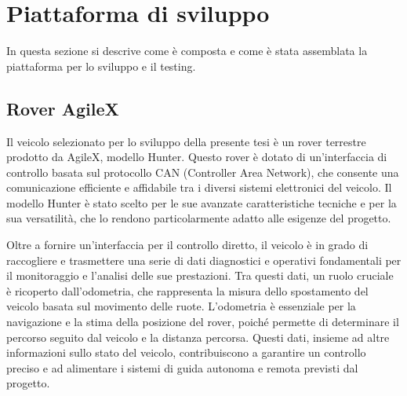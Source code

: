 \section{Piattaforma di sviluppo}
In questa sezione si descrive come è composta e come è stata assemblata la piattaforma per lo sviluppo e il testing.
\subsection{Rover AgileX}
Il veicolo selezionato per lo sviluppo della presente tesi è un rover terrestre prodotto da AgileX, modello Hunter. Questo rover è dotato di un'interfaccia di controllo basata sul protocollo CAN (Controller Area Network), che consente una comunicazione efficiente e affidabile tra i diversi sistemi elettronici del veicolo. Il modello Hunter è stato scelto per le sue avanzate caratteristiche tecniche e per la sua versatilità, che lo rendono particolarmente adatto alle esigenze del progetto.

\noindent Oltre a fornire un'interfaccia per il controllo diretto, il veicolo è in grado di raccogliere e trasmettere una serie di dati diagnostici e operativi fondamentali per il monitoraggio e l'analisi delle sue prestazioni. Tra questi dati, un ruolo cruciale è ricoperto dall'odometria, che rappresenta la misura dello spostamento del veicolo basata sul movimento delle ruote. L'odometria è essenziale per la navigazione e la stima della posizione del rover, poiché permette di determinare il percorso seguito dal veicolo e la distanza percorsa. Questi dati, insieme ad altre informazioni sullo stato del veicolo, contribuiscono a garantire un controllo preciso e ad alimentare i sistemi di guida autonoma e remota previsti dal progetto.
